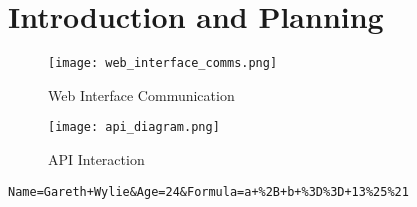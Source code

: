 \section{Introduction and Planning}

\begin{figure}[!htb]
\begin{center}
\texttt{[image: web\_interface\_comms.png]}
\end{center}
\caption{Web Interface Communication}
\label{fig:web-interface-communication}
\end{figure}

\begin{figure}[!htb]
\begin{center}
\texttt{[image: api\_diagram.png]}
\end{center}
\caption{API Interaction}
\label{fig:api-interaction}
\end{figure}

\begin{lstlisting}[caption=HTTP POST Example, label=amb]
Name=Gareth+Wylie&Age=24&Formula=a+%2B+b+%3D%3D+13%25%21
\end{lstlisting}